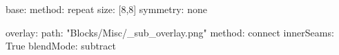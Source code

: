 base:
  method: repeat
  size: [8,8]
  symmetry: none

overlay:
  path: "Blocks/Misc/_sub_overlay.png"
  method: connect
  innerSeams: True
blendMode: subtract
